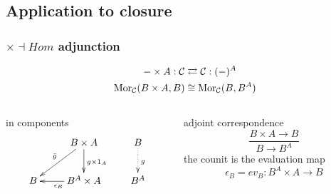 \subsection{Application to closure}
\begin{frame}[t]
\frametitle{$\times \dashv Hom$ adjunction}
\begin{block}{}
\abovedisplayskip=0pt
\begin{align*}
- \times A: \mathcal{C} & \rightleftarrows \mathcal{C}: (-)^A\\
\mathop{\rm Mor}\nolimits_{\mathcal{C}}(B \times A, B) & \cong  \mathop{\rm Mor}\nolimits_{\mathcal{C}}(B, B^A)
\end{align*}
\end{block}
\begin{columns}[t]
    \begin{column}{0.5\textwidth}
\begin{block}{in components}
			$$
			\xymatrix{
			& B \times A \ar[d]^{g \times 1_A} \ar[dl]_{\bar{g}} & B \ar@{.>}[d]^{g}\\
			B & B^A \times A \ar[l]^{\epsilon_B} & B^A}
			$$
		\end{block}
    \end{column}
    \begin{column}{0.5\textwidth}
		\begin{block}{adjoint correspondence}
		\abovedisplayskip=0pt
		$$
			\frac{B \times A \longrightarrow B}{B \longrightarrow B^A}
		$$
		the counit is the evaluation map
		$$
			\epsilon_B = ev_B \colon B^A \times A \longrightarrow B
		$$
		\end{block}		
    \end{column}
\end{columns}
\end{frame}


